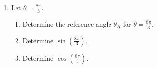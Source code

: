 \begin{enumerate}
\begin{multicols}{2}
\end{multicols}
\newpage


\item  Let $\displaystyle \theta=\frac{8\pi}{3}$.
\begin{enumerate}
\item Determine the reference angle $\theta_R$ for $\displaystyle \theta=\frac{8\pi}{3}$.\vfill
\item Determine $\sin( \frac{8\pi}{3})$.\vfill
\item Determine $\cos( \frac{8\pi}{3})$.\vfill
\end{enumerate}





\end{enumerate}



